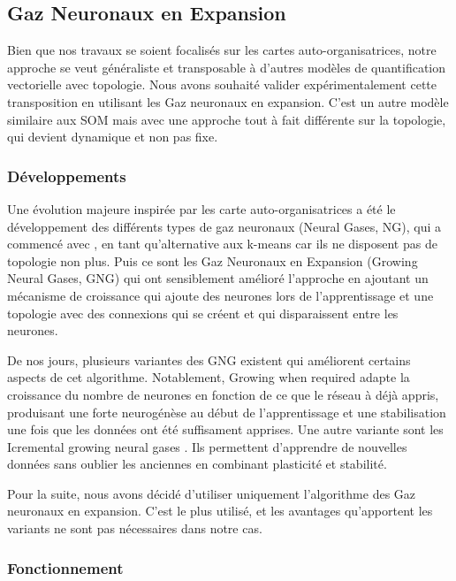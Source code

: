 	\subsection{Gaz Neuronaux en Expansion}

	Bien que nos travaux se soient focalisés sur les cartes auto-organisatrices, notre approche se veut généraliste et transposable à d'autres modèles de quantification vectorielle avec topologie. Nous avons souhaité valider expérimentalement cette transposition en utilisant les Gaz neuronaux en expansion. C'est un autre modèle similaire aux SOM mais avec une approche tout à fait différente sur la topologie, qui devient dynamique et non pas fixe. 

	\subsubsection{Développements}

	Une évolution majeure inspirée par les carte auto-organisatrices a été le développement des différents types de gaz neuronaux (Neural Gases, NG), qui a commencé avec \cite{martinetz1991neural}, en tant qu'alternative aux k-means car ils ne disposent pas de topologie non plus. Puis ce sont les Gaz Neuronaux en Expansion (Growing Neural Gases, GNG) \cite{fritzke1995growing} qui ont sensiblement amélioré l'approche en ajoutant un mécanisme de croissance qui ajoute des neurones lors de l'apprentissage et une topologie avec des connexions qui se créent et qui disparaissent entre les neurones.

	De nos jours, plusieurs variantes des GNG existent qui améliorent certains aspects de cet algorithme. Notablement, Growing when required \cite{marsland2002self} adapte la croissance du nombre de neurones en fonction de ce que le réseau à déjà appris, produisant une forte neurogénèse au début de l'apprentissage et une stabilisation une fois que les données ont été suffisament apprises. Une autre variante sont les Icremental growing neural gases \cite{prudent2005incremental}. Ils permettent d'apprendre de nouvelles données sans oublier les anciennes en combinant plasticité et stabilité.

	Pour la suite, nous avons décidé d'utiliser uniquement l'algorithme des Gaz neuronaux en expansion. C'est le plus utilisé, et les avantages qu'apportent les variants ne sont pas nécessaires dans notre cas.

	\subsubsection{Fonctionnement}


